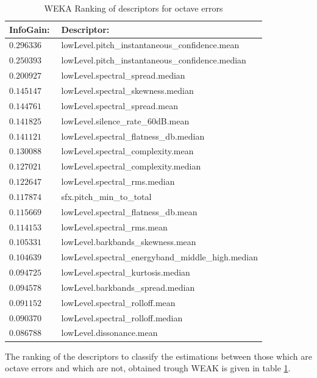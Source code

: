 \documentclass{article}
\begin{document}
\begin{table}[h]
    \begin{center}
        \begin{tabular}{ | l | l |}
            \hline
            InfoGain:   &   Descriptor: \\  \hline
            \hline
            $0.296336$  &   lowLevel.pitch\_instantaneous\_confidence.mean   \\ \hline
            $0.250393$  &   lowLevel.pitch\_instantaneous\_confidence.median   \\ \hline
            $0.200927$  &   lowLevel.spectral\_spread.median   \\ \hline
            $0.145147$  &   lowLevel.spectral\_skewness.median   \\ \hline
            $0.144761$  &   lowLevel.spectral\_spread.mean   \\ \hline
            $0.141825$  &   lowLevel.silence\_rate\_60dB.mean   \\ \hline
            $0.141121$  &   lowLevel.spectral\_flatness\_db.median   \\ \hline
            $0.130088$  &   lowLevel.spectral\_complexity.mean   \\ \hline
            $0.127021$  &   lowLevel.spectral\_complexity.median   \\ \hline
            $0.122647$  &   lowLevel.spectral\_rms.median   \\ \hline
            $0.117874$  &   sfx.pitch\_min\_to\_total   \\ \hline
            $0.115669$  &   lowLevel.spectral\_flatness\_db.mean   \\ \hline
            $0.114153$  &   lowLevel.spectral\_rms.mean   \\ \hline
            $0.105331$  &   lowLevel.barkbands\_skewness.mean   \\ \hline
            $0.104639$  &   lowLevel.spectral\_energyband\_middle\_high.median   \\ \hline
            $0.094725$  &   lowLevel.spectral\_kurtosis.median   \\ \hline
            $0.094578$  &   lowLevel.barkbands\_spread.median   \\ \hline
            $0.091152$  &   lowLevel.spectral\_rolloff.mean   \\ \hline
            $0.090370$  &   lowLevel.spectral\_rolloff.median   \\ \hline
            $0.086788$  &   lowLevel.dissonance.mean   \\ \hline

       \end{tabular}
        \caption{WEKA Ranking of descriptors for octave errors}
        \label{table:wekaOct_desc}
    \end{center}
\end{table}
The ranking of the descriptors to classify the estimations between those which are octave errors and which are not, obtained trough WEAK is given in table \ref{table:wekaOct_desc}.
\end{document}
